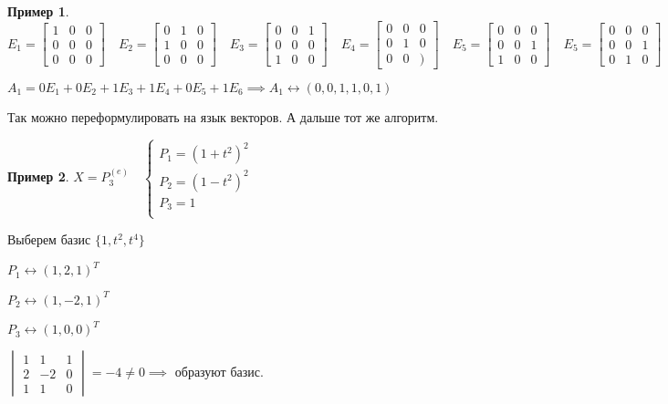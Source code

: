 \documentclass{book}
\theoremstyle{definition}
\newtheorem*{example}{Пример}
\begin{document}
\begin{example}
        $E_1 = \begin{bmatrix} 1&0&0\\0&0&0\\0&0&0 \end{bmatrix} \quad E_2 = \begin{bmatrix} 0&1&0\\1&0&0\\0&0&0 \end{bmatrix} \quad E_3 = \begin{bmatrix} 0&0&1\\0&0&0\\1&0&0 \end{bmatrix} \quad E_4 = \begin{bmatrix} 0&0&0\\0&1&0\\0&0&) \end{bmatrix} \quad E_5 = \begin{bmatrix} 0&0&0\\0&0&1\\1&0&0 \end{bmatrix} \quad E_5 = \begin{bmatrix} 0&0&0\\0&0&1\\0&1&0 \end{bmatrix} \quad E_6 = \begin{bmatrix} 0&0&0\\0&0&0\\0&0&1 \end{bmatrix} $

        $A_1 = 0E_1+0E_2+1E_3+1E_4+0E_5+1E_6 \implies A_1 \longleftrightarrow \left( 0,0,1,1,0,1 \right) $ 

        Так можно переформулировать на язык векторов. А дальше тот же алгоритм.
    \end{example}

    \begin{example}
        $X = P_3^{(e)}\quad \begin{cases}
            P_1 = (1+t^2)^2\\
            P_2 = (1-t^2)^2\\
            P_3 = 1\\
        \end{cases}$ 

        Выберем базис $\{1, t^2, t^4\}$

        $P_1 \longleftrightarrow (1,2,1)^T$

        $P_2 \longleftrightarrow \left( 1, -2, 1 \right)^T $

        $P_3 \longleftrightarrow \left( 1, 0, 0 \right) ^T$ 

        $
        \begin{vmatrix}
            1&1&1\\2&-2&0\\1&1&0
        \end{vmatrix} = -4\neq 0 \implies $ образуют базис.
    \end{example}
\end{document}
